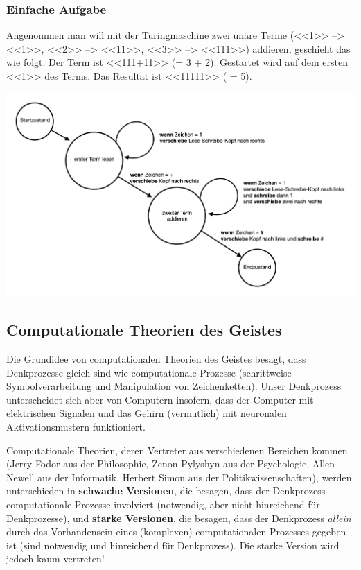 \documentclass[../main.tex]{subfiles}
\begin{document}
\subsubsection{Einfache Aufgabe}
Angenommen man will mit der Turingmaschine zwei unäre Terme (<<1>> --> <<1>>, <<2>> --> <<11>>, <<3>> --> <<111>>) addieren, geschieht das wie folgt. Der Term ist <<111+11>> (= 3 + 2). Gestartet wird auf dem ersten <<1>> des Terms. Das Resultat ist <<11111>> ( = 5).

\includegraphics[width=\textwidth]{images/turingmaschine_unaere_terme_addieren.png}

\subsection{Computationale Theorien des Geistes}
Die Grundidee von computationalen Theorien des Geistes besagt, dass Denkprozesse gleich sind wie computationale Prozesse (schrittweise Symbolverarbeitung und Manipulation von Zeichenketten). Unser Denkprozess unterscheidet sich aber von Computern insofern, dass der Computer mit elektrischen Signalen und das Gehirn (vermutlich) mit neuronalen Aktivationsmustern funktioniert. 

Computationale Theorien, deren Vertreter aus verschiedenen Bereichen kommen (Jerry Fodor aus der Philosophie, Zenon Pylyshyn aus der Psychologie, Allen Newell aus der Informatik, Herbert Simon aus der Politikwissenschaften), werden unterschieden in \textbf{schwache Versionen}, die besagen, dass der Denkprozess computationale Prozesse involviert (notwendig, aber nicht hinreichend für Denkprozesse), und \textbf{starke Versionen}, die besagen, dass der Denkprozess \textit{allein} durch das Vorhandensein eines (komplexen) computationalen Prozesses gegeben ist (sind notwendig und hinreichend für Denkprozess). Die starke Version wird jedoch kaum vertreten!
\end{document}
